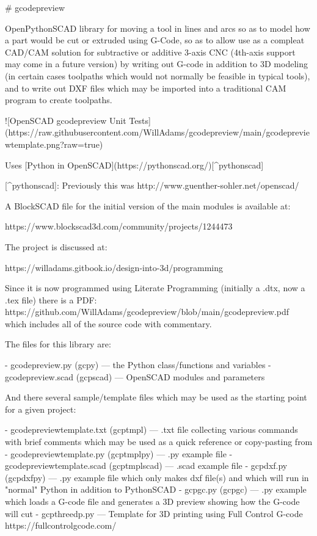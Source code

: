 \documentclass{ltxdoc}
\begin{document}
\begin{readme}
# gcodepreview

OpenPythonSCAD library for moving a tool in lines and arcs so as to model how a part would be cut or extruded using G-Code, so as to allow use as a compleat CAD/CAM solution for subtractive or additive 3-axis CNC (4th-axis support may come in a future version) by writing out G-code in addition to 3D modeling (in certain cases toolpaths which would not normally be feasible in typical tools), and to write out DXF files which may be imported into a traditional CAM program to create toolpaths. 

![OpenSCAD gcodepreview Unit Tests](https://raw.githubusercontent.com/WillAdams/gcodepreview/main/gcodepreviewtemplate.png?raw=true)

Uses [Python in OpenSCAD](https://pythonscad.org/)[^pythonscad]

[^pythonscad]: Previously this was http://www.guenther-sohler.net/openscad/ 

A BlockSCAD file for the initial version of the 
main modules is available at:

https://www.blockscad3d.com/community/projects/1244473

The project is discussed at:

https://willadams.gitbook.io/design-into-3d/programming

Since it is now programmed using Literate Programming (initially a .dtx, now a .tex file) there is a PDF: https://github.com/WillAdams/gcodepreview/blob/main/gcodepreview.pdf which includes all of the source code with commentary.

The files for this library are:

 - gcodepreview.py (gcpy) --- the Python class/functions and variables
 - gcodepreview.scad (gcpscad) --- OpenSCAD modules and parameters

And there several sample/template files which may be used as the starting point for a given project:

 - gcodepreviewtemplate.txt (gcptmpl) --- .txt file collecting various commands with brief comments which may be used as a quick reference or copy-pasting from
 - gcodepreviewtemplate.py (gcptmplpy) --- .py example file 
 - gcodepreviewtemplate.scad (gcptmplscad) --- .scad example file
 - gcpdxf.py (gcpdxfpy) --- .py example file which only makes dxf file(s) and which will run in "normal" Python in addition to PythonSCAD
 - gcpgc.py (gcpgc) --- .py example which loads a G-code file and generates a 3D preview showing how the G-code will cut
 - gcpthreedp.py --- Template for 3D printing using Full Control G-code https://fullcontrolgcode.com/


\end{readme}
\end{document}
